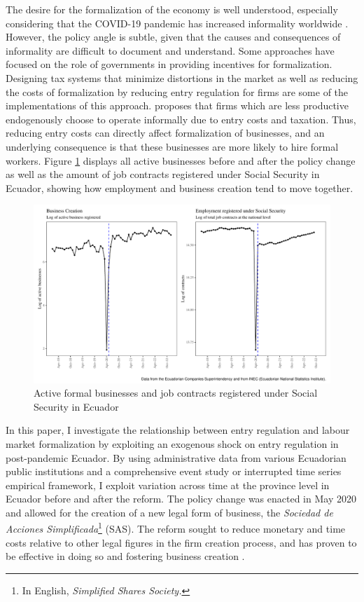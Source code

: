 \documentclass[11pt,a4paper]{article}\usepackage[]{graphicx}\usepackage[]{xcolor}
\makeatletter
\def\maxwidth{ %
  \ifdim\Gin@nat@width>\linewidth
    \linewidth
  \else
    \Gin@nat@width
  \fi
}
\newenvironment{knitrout}{}{} %
\makeatother
\begin{document}
The desire for the formalization of the economy is well understood, especially considering that the COVID-19 pandemic has increased informality worldwide \parencite{ILO.2022}. However, the policy angle is subtle, given that the causes and consequences of informality are difficult to document and understand. Some approaches have focused on the role of governments in providing incentives for formalization. Designing tax systems that minimize distortions in the market \parencite{Bardey.2019} as well as reducing the costs of formalization by reducing entry regulation for firms are some of the implementations of this approach. \textcite{MauricioPrado.2011} proposes that firms which are less productive endogenously choose to operate informally due to entry costs and taxation. Thus, reducing entry costs can directly affect formalization of businesses, and an underlying consequence is that these businesses are more likely to hire formal workers.  Figure \ref{fig:fig} displays all active businesses before and after the policy change as well as the amount of job contracts registered under Social Security in Ecuador, showing how employment and business creation tend to move together.

\begin{figure}[h]
\caption{Active formal businesses and job contracts registered under Social Security in Ecuador}
\label{fig:fig}
\begin{knitrout}
\color{fgcolor}
\includegraphics[width=\maxwidth]{figure/figure-1-1} 
\end{knitrout}
\end{figure}

In this paper, I investigate the relationship between entry regulation and labour market formalization by exploiting an exogenous shock on entry regulation in post-pandemic Ecuador. By using administrative data from various Ecuadorian public institutions and a comprehensive event study or interrupted time series empirical framework, I exploit variation across time at the province level in Ecuador before and after the reform. The policy change was enacted in May 2020 and allowed for the creation of a new legal form of business, the \textit{Sociedad de Acciones Simplificada}\footnote{In English, \textit{Simplified Shares Society.}} (SAS). The reform sought to reduce monetary and time costs relative to other legal figures in the firm creation process, and has proven to be effective in doing so and fostering business creation \parencite{CaminoMogro.2022}.
\end{document}
